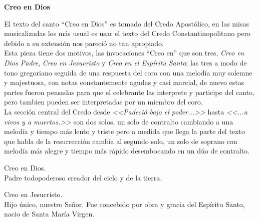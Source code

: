 \documentclass[12pt, letterpaper]{report}
\begin{document}



    \begin{center}
      \LARGE \textbf{Creo en Dios}
    \end{center}

    \Large El texto del canto ``Creo en Dios'' es tomado del Credo Apost\'olico, en las misas musicalizadas los m\'as usual es usar el texto del Credo Constantinopolitano pero debido a su extensi\'on nos pareci\'o no tan apropiado.\\
    Esta pieza tiene dos motivos, las invocaciones ``Creo en'' que son tres, \textit{Creo en Dios Padre}, \textit{Creo en Jesucristo} y \textit{Creo en el Esp\'iritu Santo}; las tres a modo de tono gregoriano seguida de una respuesta del coro con una melod\'ia muy solemne y majestuosa, con notas constantemente agudas y casi marcial, de nuevo estas partes fueron pensadas para que el celebrante las interprete y participe del canto, pero tambien pueden ser interpretadas por un miembro del coro.\\ La secci\'on central del Credo desde \textit{<<Padeci\'o bajo el poder...>>} hasta \textit{<<...a vivos y a muertos.>>} son dos solos, un solo de contralto cambiando a una melod\'ia y tiempo m\'as lento y triste pero a medida que llega la parte del texto que habla de la resurrecci\'on cambia al segundo solo, un solo de soprano con melod\'ia m\'as alegre y tiempo m\'as r\'apido desembocando en un d\'uo de contralto.

    \noindent
    \LARGE Creo en Dios.\\
    Padre todopoderoso creador del cielo y de la tierra.

    \noindent
    Creo en Jesucristo. \\
    Hijo \'unico, nuestro Se\~nor. Fue concebido por obra y gracia del Esp\'iritu Santo, nacio de Santa Mar\'ia Virgen.
\end{document}

